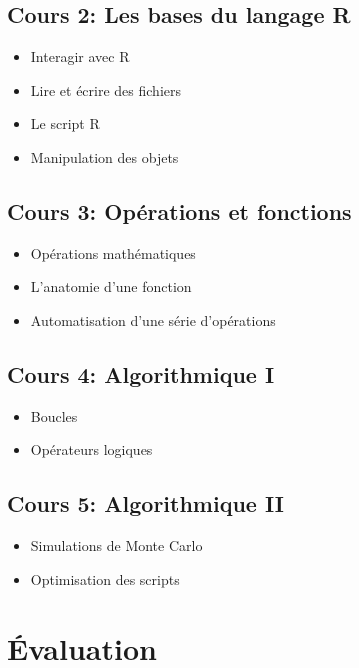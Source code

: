 \documentclass[12]{article}
\begin{document}
	\subsection*{Cours 2: Les bases du langage R}
	\renewcommand{\labelitemi}{$\bullet$}
	\begin{itemize}
		\item Interagir avec R
		\item Lire et écrire des fichiers
		\item Le script R
		\item Manipulation des objets
	\end{itemize}

	\subsection*{Cours 3: Opérations et fonctions}
	\renewcommand{\labelitemi}{$\bullet$}
	\begin{itemize}
		\item Opérations mathématiques
		\item L'anatomie d'une fonction
		\item Automatisation d'une série d'opérations
	\end{itemize}

	\subsection*{Cours 4: Algorithmique I}
	\renewcommand{\labelitemi}{$\bullet$}
	\begin{itemize}
		\item Boucles
		\item Opérateurs logiques
	\end{itemize}

	\subsection*{Cours 5: Algorithmique II}
	\renewcommand{\labelitemi}{$\bullet$}
	\begin{itemize}
		\item Simulations de Monte Carlo
		\item Optimisation des scripts
	\end{itemize}

	\section*{Évaluation}
\end{document}
